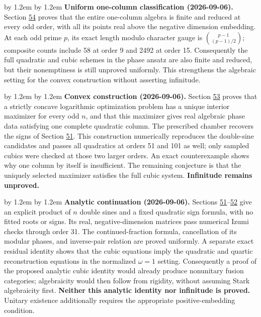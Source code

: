 \documentclass[11pt,reqno]{amsart}
\theoremstyle{plain}
\newenvironment{revnote}%
  {\par\addvspace{0.7\baselineskip}\begingroup\small
   \advance\leftskip by 1.2em \advance\rightskip by 1.2em \noindent\ignorespaces}%
  {\par\endgroup\addvspace{0.7\baselineskip}}
\begin{document}
\begin{revnote}
\textbf{Uniform one-column classification (2026-09-06).} Section \hyperref[sec:54]{54} proves that the entire one-column algebra is finite and reduced at every odd order, with all its points real above the negative dimension embedding. At each odd prime \(p\), its exact length modulo character gauge is \(\binom{p-1}{(p-1)/2}\); composite counts include 58 at order 9 and 2492 at order 15. Consequently the full quadratic and cubic schemes in the phase ansatz are also finite and reduced, but their nonemptiness is still unproved uniformly. This strengthens the algebraic setting for the convex construction without asserting infinitude.
\end{revnote}

\begin{revnote}
\textbf{Convex construction (2026-09-06).} Section \hyperref[sec:53]{53} proves that a strictly concave logarithmic optimization problem has a unique interior maximizer for every odd \(n\), and that this maximizer gives real algebraic phase data satisfying one complete quadratic column. The prescribed chamber recovers the signs of Section \hyperref[sec:51]{51}. This construction numerically reproduces the double-sine candidates and passes all quadratics at orders 51 and 101 as well; only sampled cubics were checked at those two larger orders. An exact counterexample shows why one column by itself is insufficient. The remaining conjecture is that the uniquely selected maximizer satisfies the full cubic system. \textbf{Infinitude remains unproved.}
\end{revnote}

\begin{revnote}
\textbf{Analytic continuation (2026-09-06).} Sections \hyperref[sec:51]{51}--\hyperref[sec:52]{52} give an explicit product of \(n\) double sines and a fixed quadratic sign formula, with no fitted roots or signs. Its real, negative-dimension matrices pass numerical Izumi checks through order 31. The continued-fraction formula, cancellation of its modular phases, and inverse-pair relation are proved uniformly. A separate exact residual identity shows that the cubic equations imply the quadratic and quartic reconstruction equations in the normalized \(\omega=1\) setting. Consequently a proof of the proposed analytic cubic identity would already produce nonunitary fusion categories; algebraicity would then follow from rigidity, without assuming Stark algebraicity first. \textbf{Neither this analytic identity nor infinitude is proved.} Unitary existence additionally requires the appropriate positive-embedding condition.
\end{revnote}
\end{document}
